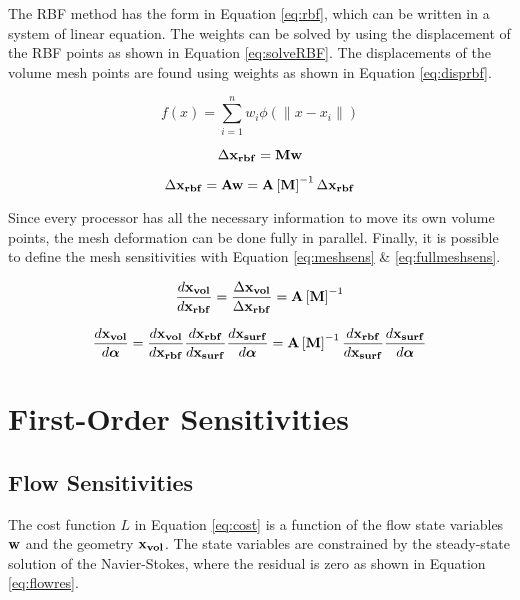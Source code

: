 \documentclass[letterpaper,12pt,]{article}
\begin{document}
The RBF method has the form in Equation \ref{eq:rbf}, which can be written in a system of linear equation.
The weights can be solved by using the displacement of the RBF points as shown in Equation \ref{eq:solveRBF}.
The displacements of the volume mesh points are found using weights as shown in Equation \ref{eq:disprbf}.

\begin{equation}
	f(x) = \sum_{i=1}^n w_i \phi(\|x - x_i\|)
	\label{eq:rbf}
\end{equation}

\begin{equation}
	\Delta \mathbf{x_{rbf}}
		= \mathbf{M} 
		  \mathbf{w}
	\label{eq:solveRBF}
\end{equation}


\begin{equation}
	\Delta \mathbf{x_{rbf}} 
		= \mathbf{A} 
		  \mathbf{w}
		= \mathbf{A}
		  \left[\mathbf{M}\right]^{-1}
		  \Delta \mathbf{x_{rbf}}
	\label{eq:disprbf}
\end{equation}

Since every processor has all the necessary information to move its own volume points, the mesh deformation can be done fully in parallel.
Finally, it is possible to define the mesh sensitivities with Equation \ref{eq:meshsens} \& \ref{eq:fullmeshsens}.

\begin{equation}
	\dfrac{d\mathbf{x_{vol}}}{d\mathbf{x_{rbf}}}
	= \dfrac{\Delta \mathbf{x_{vol}}}{\Delta \mathbf{x_{rbf}}}
		= \mathbf{A}
		  \left[\mathbf{M}\right]^{-1}
	\label{eq:meshsens}
\end{equation}

\begin{equation}
	\dfrac{d\mathbf{x_{vol}}}{d\boldsymbol{\alpha}}
	=
	\dfrac{d\mathbf{x_{vol}}}{d\mathbf{x_{rbf}}}
	\dfrac{d\mathbf{x_{rbf}}}{d\mathbf{x_{surf}}}
	\dfrac{d\mathbf{x_{surf}}}{d\boldsymbol{\alpha}}
	=
	\mathbf{A}
	\left[\mathbf{M}\right]^{-1}
	\dfrac{d\mathbf{x_{rbf}}}{d\mathbf{x_{surf}}}
	\dfrac{d\mathbf{x_{surf}}}{d\boldsymbol{\alpha}}
	\label{eq:fullmeshsens}
\end{equation}

\section*{First-Order Sensitivities}

\subsection*{Flow Sensitivities}

The cost function $L$ in Equation \ref{eq:cost} is a function of the flow state variables $\mathbf{w}$ and the geometry $\mathbf{x_{vol}}$.
The state variables are constrained by the steady-state solution of the Navier-Stokes, where the residual is zero as shown in Equation \ref{eq:flowres}.
\end{document}
